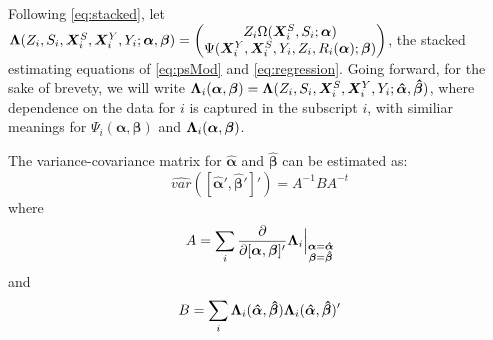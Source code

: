 \documentclass{statsoc} %
\begin{document}
Following \eqref{eq:stacked}, let $\bm{\Lambda}(Z_i,S_i,\bm{X}^S_i,\bm{X}^Y_i,Y_i;\bm{\alpha},\bm{\beta})=\begin{pmatrix} Z_i\Omega(\bm{X}^S_i,S_i;\bm{\alpha})\\ \Psi(\bm{X}^Y_i,\bm{X}^S_i,Y_i,Z_i,R_i(\bm{\alpha});\bm{\beta})\end{pmatrix}$, the stacked estimating equations of \eqref{eq:psMod} and \eqref{eq:regression}.
Going forward, for the sake of brevety, we will write $\bm{\Lambda}_i(\bm{\alpha},\bm{\beta})=\bm{\Lambda}(Z_i,S_i,\bm{X}^S_i,\bm{X}^Y_i,Y_i;\bm{\hat{\alpha}},\bm{\hat{\beta}})$, where dependence on the data for $i$ is captured in the subscript $i$, with similiar meanings for $\Psi_i(\bm{\alpha},\bm{\beta})$ and $\bm{\Lambda}_i(\bm{\alpha},\bm{\beta})$. 

The variance-covariance matrix for $\bm{\hat{\alpha}}$ and $\bm{\hat{\beta}}$ can be estimated as:
\begin{equation*}
  \widehat{var}\left([\bm{\hat{\alpha}}',\bm{\hat{\beta}}']'\right)=A^{-1}BA^{-t}
\end{equation*}
where
\begin{equation*}%
  A=\sum_i \frac{\partial}{\partial [\bm{\alpha},\bm{\beta}]'} \blam_i\Bigr|_{\substack{\bm{\alpha}=\bm{\hat{\alpha}}\\\bm{\beta}=\bm{\hat{\beta}}}}
\end{equation*}
and
\begin{equation*}%
  B=\sum_i \blam_i(\bm{\hat{\alpha}},\bm{\hat{\beta}})\blam_i(\bm{\hat{\alpha}},\bm{\hat{\beta}})'
\end{equation*}
\end{document}
